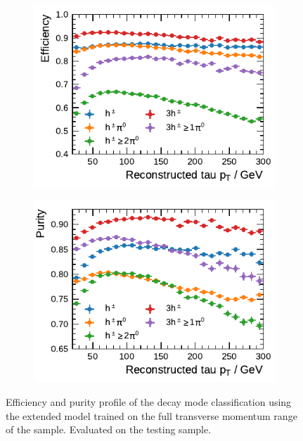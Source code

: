\begin{figure}[htb]
  \begin{subfigure}{0.48\textwidth}
    \centering
    \includegraphics{./figures/decay_mode_classification/highpt/efficiency_profile_extended.pdf}
    \vspace*{-1.6em}
    \subcaption{}
  \end{subfigure}\hfill
  \begin{subfigure}{0.48\textwidth}
    \centering
    \includegraphics{./figures/decay_mode_classification/highpt/purity_profile_extended.pdf}
    \vspace*{-1.6em}
    \subcaption{}
  \end{subfigure}
  \caption{Efficiency and purity profile of the decay mode classification using
    the extended model trained on the full transverse momentum range of the
    sample. Evaluated on the testing sample.}
  \label{fig:mode_efficiency_purity_highpt}
\end{figure}

